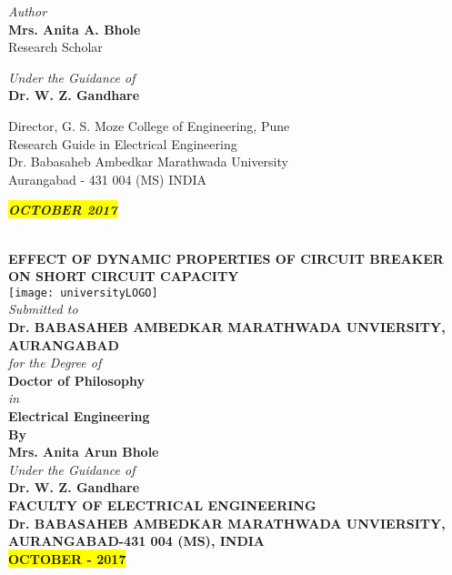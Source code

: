 \textit{\small Author}\\
\textcolor{ured}{\textbf{\large Mrs. Anita A. Bhole}}\\
\small Research Scholar
\vspace{3cm}

\textit{\small Under the Guidance of}\\
\textcolor{ured}{\textbf{\large Dr. W. Z. Gandhare}}\\
\vspace{0.5cm}

\small Director, G. S. Moze College of Engineering, Pune\\
\small Research Guide in Electrical Engineering\\
\small Dr. Babasaheb Ambedkar Marathwada University\\
\small Aurangabad - 431 004 (MS) INDIA
\vspace{2cm}

\colorbox{Yellow}{\textbf{\textit{\large OCTOBER 2017}}}
\clearpage
\begin{center}
~\\
\textbf{\large EFFECT OF DYNAMIC PROPERTIES OF CIRCUIT BREAKER ON SHORT CIRCUIT CAPACITY}\\
\vspace{0.5cm}
\texttt{[image: universityLOGO]}\\
\vspace{0.8cm}
\textit{\normalsize Submitted to}\\
\textbf{\large Dr. BABASAHEB AMBEDKAR MARATHWADA UNVIERSITY, AURANGABAD}\\
\vspace{1cm}
\textit{\normalsize for the Degree of}\\
\textbf{\normalsize Doctor of Philosophy}\\
\textit{\normalsize in} \\
\textbf{\normalsize Electrical Engineering}\\
\textbf{\small By}\\
\textbf{\large Mrs. Anita Arun Bhole}\\
\textit{\normalsize Under the Guidance of}\\
\textbf{\large Dr. W. Z. Gandhare}\\
\vspace{1cm}
\textbf{\large FACULTY OF ELECTRICAL ENGINEERING}\\
\textbf{\large Dr. BABASAHEB AMBEDKAR MARATHWADA UNVIERSITY, AURANGABAD-431 004 (MS), INDIA\\
\colorbox{Yellow}{OCTOBER - 2017}}
\end{center}

